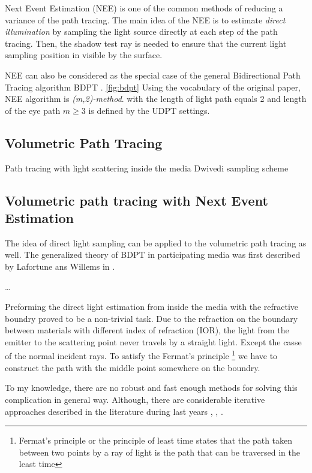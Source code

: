 Next Event Estimation (\gls{NEE}) is one of the common methods of reducing a
variance of the path tracing. The main idea of the \gls{NEE} is to estimate
\textit{direct illumination} by sampling the light source directly at each step
of the path tracing. Then, the shadow test ray is needed to ensure that the
current light sampling position in visible by the surface.

\gls{NEE} can also be considered as the special case of the general
Bidirectional Path Tracing algorithm \gls{BDPT} \cite{Veach:94:BDPT}.
\ref{fig:bdpt} Using the vocabulary of the original paper, NEE algorithm is
\textit{(m,2)-method}. with the length of light path equals 2 and length of the eye path $m\geq3$ is defined by
the \gls{UDPT} settings.

\subsection{Volumetric Path Tracing}
Path tracing with light scattering inside the media
Dwivedi sampling scheme

\subsection{Volumetric path tracing with Next Event Estimation}
The idea of direct light sampling can be applied to the volumetric path tracing
as well.
The generalized theory of \gls{BDPT} in participating media was first described
by Lafortune ans Willems in \cite{Lafortune:1996:RPM:275458.275468}. 

\ldots

Preforming the direct light estimation from inside the media with the refractive
boundry proved to be a non-trivial task.
Due to the refraction on the boundary between materials with different index of
refraction (\gls{IOR}), the light from the emitter to the scattering point never
travels by a straight light. Except the casse of the normal incident rays. To
satisfy the Fermat's principle
\footnote{Fermat's principle or the principle of least time states that the path taken between two points by a ray of light is the path that can be traversed in the least time}
we have to construct the path with the middle point somewhere on the boundry.

To my knowledge, there are no robust and fast enough methods for solving this
complication in general way. Although, there are considerable iterative
approaches described in the literature during last years
\cite{holzschuch:hal-01083246}, \cite{10.1111:cgf.12681}, \cite{Koerner2016}.


